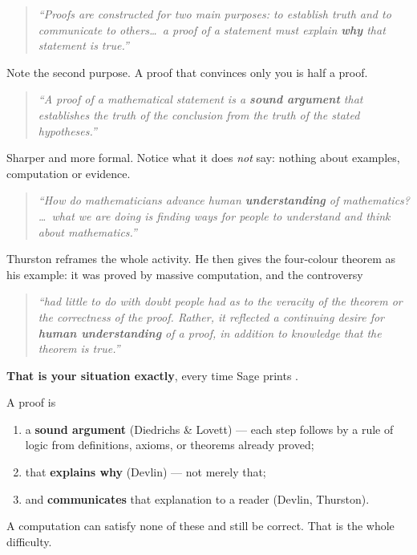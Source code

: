 \begin{bookbox}[title={Devlin, \textit{Introduction to Mathematical Thinking}, §3.1 (p.~117 book, \bk{01\_Start\_Here})}]
\begin{quote}\itshape
``Proofs are constructed for two main purposes: to establish truth and to communicate to others\ldots\
a proof of a statement must explain \textbf{why} that statement is true.''
\end{quote}
Note the second purpose. A proof that convinces only you is half a proof.
\end{bookbox}

\begin{bookbox}[title={Diedrichs \& Lovett, \textit{Transition to Advanced Mathematics}, Definition 2.1.15 (\bk{02\_Main\_Reference})}]
\begin{quote}\itshape
``A proof of a mathematical statement is a \textbf{sound argument} that establishes the truth of the
conclusion from the truth of the stated hypotheses.''
\end{quote}
Sharper and more formal. Notice what it does \emph{not} say: nothing about examples, computation or
evidence.
\end{bookbox}

\begin{bookbox}[title={Thurston, \textit{On Proof and Progress in Mathematics}, p.~2 (\bk{01\_Start\_Here})}]
\begin{quote}\itshape
``How do mathematicians advance human \textbf{understanding} of mathematics? \ldots\ what we are
doing is finding ways for people to understand and think about mathematics.''
\end{quote}
Thurston reframes the whole activity. He then gives the four-colour theorem as his example: it was
proved by massive computation, and the controversy
\begin{quote}\itshape
``had little to do with doubt people had as to the veracity of the theorem or the correctness of the
proof. Rather, it reflected a continuing desire for \textbf{human understanding} of a proof, in
addition to knowledge that the theorem is true.''
\end{quote}
\textbf{That is your situation exactly}, every time Sage prints .
\end{bookbox}

\begin{techbox}[title={Putting the three together}]
A proof is
\begin{enumerate}[label=\textbf{\arabic*.}]
\item a \textbf{sound argument} (Diedrichs \& Lovett) --- each step follows by a rule of logic from
 definitions, axioms, or theorems already proved;
\item that \textbf{explains why} (Devlin) --- not merely that;
\item and \textbf{communicates} that explanation to a reader (Devlin, Thurston).
\end{enumerate}
A computation can satisfy none of these and still be correct. That is the whole difficulty.
\end{techbox}
